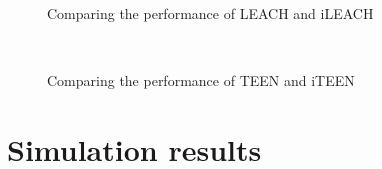 \documentclass{article}
\begin{document}
\begin{figure}
\centering
\mbox{\quad
{}}
\caption{Comparing the performance of LEACH and iLEACH} \label{fig12}
\end{figure}

\begin{figure}
\centering
\mbox{\quad
{}}
\caption{Comparing the performance of TEEN and iTEEN} \label{fig12}
\end{figure}

\section{Simulation results}
\end{document}

